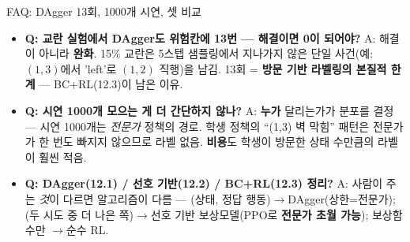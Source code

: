 \documentclass[aspectratio=169,11pt]{beamer}
\begin{document}

\begin{frame}{FAQ: DAgger 13회, 1000개 시연, 셋 비교}
  \small
  \begin{itemize}
    \item \textbf{Q: 교란 실험에서 DAgger도 위험칸에 13번 — 해결이면
      0이 되어야?} A: 해결이 아니라 \textbf{완화}. 15\% 교란은
      5스텝 샘플링에서 지나가지 않은 단일 사건(예: $(1,3)$에서
      'left'로 $(1,2)$ 직행)을 남김. 13회 = \textbf{방문 기반
      라벨링의 본질적 한계} — BC+RL(12.3)이 남은 이유.
    \item \textbf{Q: 시연 1000개 모으는 게 더 간단하지 않나?}
      A: \textbf{누가} 달리는가가 분포를 결정 — 시연 1000개는
      \textit{전문가} 정책의 경로. 학생 정책의 ``(1,3) 벽 막힘''
      패턴은 전문가가 한 번도 빠지지 않으므로 라벨 없음.
      \textbf{비용}도 학생이 방문한 상태 수만큼의 라벨이 훨씬 적음.
    \item \textbf{Q: DAgger(12.1) / 선호 기반(12.2) / BC+RL(12.3)
      정리?} A: 사람이 주는 \textit{것}이 다르면 알고리즘이 다름 —
      (상태, 정답 행동)$\to$DAgger(상한=전문가); (두 시도 중 더
      나은 쪽)$\to$선호 기반 보상모델(PPO로 \textbf{전문가 초월
      가능}); 보상함수만 $\to$순수 RL.
  \end{itemize}
\end{frame}
\end{document}
